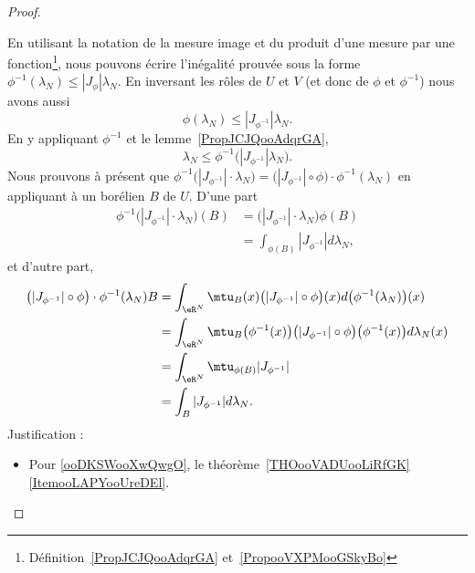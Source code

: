 \begin{proof}
\begin{enumerate}
\begin{subproof}

			      En utilisant la notation de la mesure image et du produit d'une mesure par une fonction\footnote{Définition~\ref{PropJCJQooAdqrGA} et~\ref{PropooVXPMooGSkyBo}}, nous pouvons écrire l'inégalité prouvée sous la forme \( \phi^{-1}(\lambda_N)\leq | J_{\phi} |\lambda_N\). En inversant les rôles de \( U\) et \( V\) (et donc de \( \phi\) et \( \phi^{-1}\)) nous avons aussi
			      \begin{equation}
				      \phi(\lambda_N)\leq| J_{\phi^{-1}} |\lambda_N.
			      \end{equation}
			      En y appliquant \( \phi^{-1}\) et le lemme~\ref{PropJCJQooAdqrGA},
			      \begin{equation}        \label{EqooHJCHooVIaheI}
				      \lambda_N\leq \phi^{-1}\big( | J_{\phi^{-1}} |\lambda_N \big).
			      \end{equation}
			      Nous prouvons à présent que \( \phi^{-1}\big( | J_{\phi^{-1}} |\cdot \lambda_N \big)=\Big( | J_{\phi^{-1}} |\circ\phi \Big)\cdot \phi^{-1}(\lambda_N)\) en appliquant à un borélien \( B\) de \(U\).
			      D'une part
			      \begin{subequations}
				      \begin{align}
					      \phi^{-1}\big( | J_{\phi^{-1}} |\cdot\lambda_N \big)(B) & =\big( | J_{\phi^{-1}} |\cdot\lambda_N \big)\phi(B) \\
					                                                              & =\int_{\phi(B)}| J_{\phi^{-1}} |d\lambda_N,
				      \end{align}
			      \end{subequations}
			      et d'autre part,
			      \begin{subequations}
				      \begin{align}
					      \big( | J_{\phi^{-1}} |\circ\phi \big)\cdot\phi^{-1}(\lambda_N)B & =\int_{\eR^N}\mtu_B(x)\big( | J_{\phi^{-1}} |\circ\phi \big)(x)d\big( \phi^{-1}(\lambda_N) \big)(x)                                                    \\
					                                                                       & =   \int_{\eR^N}\mtu_B\big( \phi^{-1}(x) \big)\big( | J_{\phi^{-1}} |\circ\phi \big)\big( \phi^{-1}(x) \big)d\lambda_N(x)       \label{ooDKSWooXwQwgO} \\
					                                                                       & =\int_{\eR^N}\mtu_{\phi(B)}| J_{\phi^{-1}} |                                                                                                           \\
					                                                                       & =\int_B| J_{\phi^{-1}} |d\lambda_N.
				      \end{align}
			      \end{subequations}
			      Justification :
			      \begin{itemize}
				      \item Pour \eqref{ooDKSWooXwQwgO}, le théorème~\ref{THOooVADUooLiRfGK}\ref{ItemooLAPYooUreDEl}.
			      \end{itemize}


\end{subproof}
\end{enumerate}
\end{proof}
